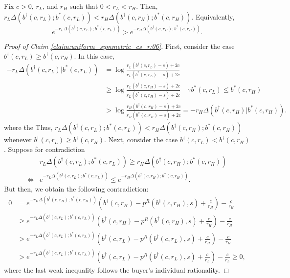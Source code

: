 \begin{appendices}
\begin{claim}\label{claim:uniform_symmetric_cs_r:06}
Fix $c>0$, $r_L$, and $r_H$ such that $0<r_L<r_H$. Then, $r_L\Delta(b^\dagger(c,r_L);b^*(c,r_L)) < r_H\Delta(b^\dagger(c,r_H);b^*(c,r_H))$. Equivalently,
    $$
    e^{-r_L\Delta(b^\dagger(c,r_L);b^*(c,r_L))}> e^{-r_H\Delta(b^\dagger(c,r_H);b^*(c,r_H))}.
    $$
\end{claim}

\begin{proof}[Proof of Claim \ref{claim:uniform_symmetric_cs_r:06}]
First, consider the case $b^\dagger(c, r_L) \geq b^\dagger(c, r_H)$. In this case, 
    \begin{align*}
    -r_L\Delta(b^\dagger(c, r_L)|b^*(c, r_L))&=\log\frac{r_L(b^\dagger(c, r_L)-s)+2c}{r_L(b^*(c, r_L)-s)+2c}
    \\
    &\geq \log\frac{r_L(b^\dagger(c, r_H)-s)+2c}{r_L(b^*(c, r_H)-s)+2c} \quad \because b^*(c, r_L) \leq b^*(c, r_H)
    \\
    &> \log\frac{r_H(b^\dagger(c, r_H)-s)+2c}{r_H(b^*(c, r_H)-s)+2c} = -r_H\Delta(b^\dagger(c, r_H)|b^*(c, r_H)). 
    \end{align*} 
   where the 
Thus, $r_L\Delta(b^\dagger(c, r_L);b^*(c, r_L)) < r_H\Delta(b^\dagger(c, r_H);b^*(c, r_H))$ whenever $b^\dagger(c, r_L) \geq b^\dagger(c, r_H)$. 
Next, consider the case $b^\dagger(c, r_L) < b^\dagger(c, r_H)$. Suppose for contradiction 
    \begin{align*}
    &r_L\Delta(b^\dagger(c, r_L);b^*(c, r_L)) \geq r_H\Delta(b^\dagger(c, r_H);b^*(c, r_H)) 
    \\
    \iff&
    e^{-r_L\Delta(b^\dagger(c, r_L);b^*(c, r_L))} \leq e^{-r_H\Delta(b^\dagger(c, r_H);b^*(c, r_H))}.
    \end{align*}
But then, we obtain the following contradiction: 
    \begin{align*}
    0&=e^{-r_H\Delta(b^\dagger(c, r_H);b^*(c, r_H))}\left(b^\dagger(c, r_H)-p^R(b^\dagger(c, r_H),s)+\frac{c}{r_H}\right)-\frac{c}{r_H}
    \\
    &\geq e^{-r_L\Delta(b^\dagger(c, r_L);b^*(c, r_L))}\left(b^\dagger(c, r_H)-p^R(b^\dagger(c, r_H),s)+\frac{c}{r_H}\right)-\frac{c}{r_H}
    \\
    &>e^{-r_L\Delta(b^\dagger(c, r_L);b^*(c, r_L))}\left(b^\dagger(c, r_L)-p^R(b^\dagger(c, r_L),s)+\frac{c}{r_H}\right)-\frac{c}{r_H}
    \\
    &>e^{-r_L\Delta(b^\dagger(c, r_L);b^*(c, r_L))}\left(b^\dagger(c, r_L)-p^R(b^\dagger(c, r_L),s)+\frac{c}{r_L}\right)-\frac{c}{r_L} \geq 0, 
    \end{align*}
where the last weak inequality follows the buyer's individual rationality. 
\end{proof}


\end{appendices}
